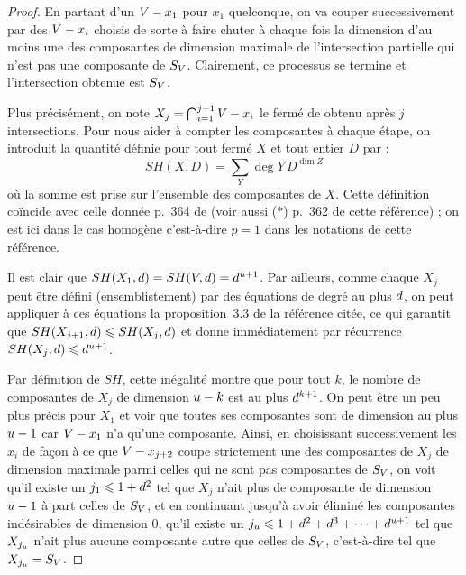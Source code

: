 \begin{proof}
  En partant d'un \( V - x_1 \) pour \( x_1 \) quelconque, on va couper
  successivement par des \( V - x_i \) choisis de sorte à faire chuter à
  chaque fois la dimension d'au moins une des composantes de dimension
  maximale de l'intersection partielle qui n'est pas une composante de \(
    S_V \).  Clairement, ce processus se termine et l'intersection obtenue
  est \( S_V \).

  Plus précisément, on note \( X_j = \bigcap_{i=1}^{j+1} V - x_i \) le
  fermé de  obtenu après \( j \) intersections.  Pour nous aider
  à compter les composantes à chaque étape, on introduit la quantité définie
  pour tout fermé \( X \) et tout entier \( D \) par :
  \begin{equation}
    SH(X, D)
    =
    \sum_Y \deg Y \, D^{\dim Z}
  \end{equation}
  où la somme est prise sur l'ensemble des composantes de \( X \). Cette
  définition coïncide avec celle donnée p.~364 de \cite{philz} (voir aussi
  ($*$) p.~362 de cette référence) ; on est ici dans le cas homogène
  c'est-à-dire \( p = 1 \) dans les notations de cette référence.

  Il est clair que \( SH(X_1, d) = SH(V, d) = d^{u+1} \).
  Par ailleurs, comme chaque \( X_j \) peut être défini (ensemblistement) par
  des équations de degré au plus \( d \), on peut appliquer à ces
  équations la proposition~3.3 de la référence citée, ce qui garantit que \(
    SH(X_{j+1}, d) \leqslant SH(X_j, d) \) et donne immédiatement par
  récurrence \( SH(X_j, d) \leqslant d^{u+1} \).

  Par définition de \( SH \), cette inégalité montre que pour tout \( k \), le
  nombre de composantes de \( X_j \) de dimension \( u - k \) est au plus
  \( d^{k+1} \).  On peut être un peu plus précis pour \( X_1 \) et voir
  que toutes ses composantes sont de dimension au plus \( u - 1 \) car \(
    V - x_1 \) n'a qu'une composante. Ainsi, en choisissant successivement
  les \( x_i \) de façon à ce que \( V - x_{j+2} \) coupe strictement une
  des composantes de \( X_j \) de dimension maximale parmi celles qui ne sont
  pas composantes de \( S_V \), on voit qu'il existe un \( j_1 \leqslant 1 +
    d^2 \) tel que \( X_j \) n'ait plus de composante de dimension \(
    u - 1 \) à part celles de \( S_V \), et en continuant jusqu'à
  avoir éliminé les composantes indésirables de dimension \( 0 \), qu'il
  existe un \( j_u \leqslant 1 + d^2 + d^3 + \dots + d^{u+1} \)
  tel que \( X_{j_u} \) n'ait plus aucune composante autre que celles de
  \( S_V \), c'est-à-dire tel que \( X_{j_u} = S_V \).


\end{proof}
